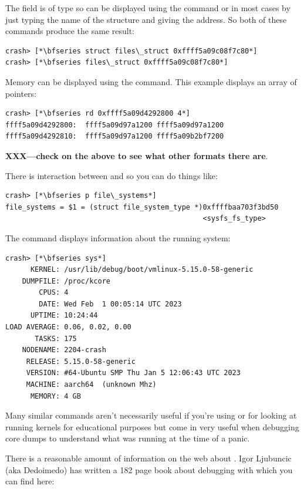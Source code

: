 \noindent
The  field is of type  so can be displayed using the  command or in most cases by just typing the name of the structure and giving the address. So both of these commands produce the same result:

\begin{lstlisting}
crash> [*\bfseries struct files\_struct 0xffff5a09c08f7c80*]
crash> [*\bfseries files\_struct 0xffff5a09c08f7c80*]
\end{lstlisting}

\noindent
Memory can be displayed using the  command. This example displays an array of pointers:

\begin{lstlisting}
crash> [*\bfseries rd 0xffff5a09d4292800 4*]
ffff5a09d4292800:  ffff5a09d97a1200 ffff5a09d97a1200 
ffff5a09d4292810:  ffff5a09d97a1200 ffff5a09b2bf7200  
\end{lstlisting}

\noindent
\textbf{XXX---check on the above to see what other formats there are}.

There is interaction between  and  so you can do things like:

\begin{lstlisting}
crash> [*\bfseries p file\_systems*]
file_systems = $1 = (struct file_system_type *)0xffffbaa703f3bd50
                                               <sysfs_fs_type>
\end{lstlisting}

\noindent
The  command displays information about the running system:

\begin{lstlisting}
crash> [*\bfseries sys*]
      KERNEL: /usr/lib/debug/boot/vmlinux-5.15.0-58-generic
    DUMPFILE: /proc/kcore
        CPUS: 4
        DATE: Wed Feb  1 00:05:14 UTC 2023
      UPTIME: 10:24:44
LOAD AVERAGE: 0.06, 0.02, 0.00
       TASKS: 175
    NODENAME: 2204-crash
     RELEASE: 5.15.0-58-generic
     VERSION: #64-Ubuntu SMP Thu Jan 5 12:06:43 UTC 2023
     MACHINE: aarch64  (unknown Mhz)
      MEMORY: 4 GB
\end{lstlisting}

\noindent
Many similar commands aren't necessarily useful if you're using  or  for looking at running kernels for educational purposes but come in very useful when debugging core dumps to understand what was running at the time of a panic.

There is a reasonable amount of information on the web about . Igor Ljubuncic (aka Dedoimedo) has written a 182 page book about debugging with  which you can find here:

